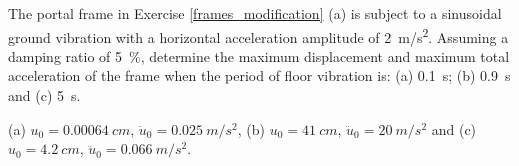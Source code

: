 
\begin{Exercise}[label={frame_ground_acceleration}]
The portal frame in Exercise \ref{frames_modification} (a) is subject to a sinusoidal ground vibration with a horizontal acceleration amplitude of \SI{2}{m/s^2}. Assuming a damping ratio of \SI{5}{\%}, determine the maximum displacement and maximum total acceleration of the frame when the period of floor vibration is: (a) \SI{0.1}{s}; (b) \SI{0.9}{s} and (c) \SI{5}{s}.

\begin{center}
\end{center}

\shortAnswer (a) $u_0 = \SI{0.00064}{cm}$, $\ddot{u}_0 = \SI{0.025}{m/s^2}$, (b) $u_0 = \SI{41}{cm}$, $\ddot{u}_0 = \SI{20}{m/s^2}$ and (c) $u_0 = \SI{4.2}{cm}$, $\ddot{u}_0 = \SI{0.066}{m/s^2}$.
\end{Exercise}



